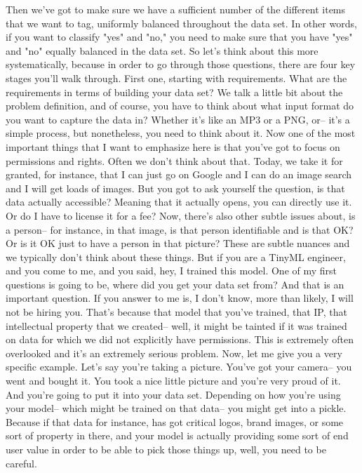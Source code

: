 Then we've got to make sure we have a sufficient number
of the different items that we want to tag, uniformly
balanced throughout the data set.
In other words, if you want to classify "yes" and "no,"
you need to make sure that you have "yes" and "no" equally balanced
in the data set.
So let's think about this more systematically,
because in order to go through those questions,
there are four key stages you'll walk through.
First one, starting with requirements.
What are the requirements in terms of building your data set?
We talk a little bit about the problem definition,
and of course, you have to think about what input format do you
want to capture the data in?
Whether it's like an MP3 or a PNG, or--
it's a simple process, but nonetheless, you need to think about it.
Now one of the most important things that I want to emphasize
here is that you've got to focus on permissions and rights.
Often we don't think about that.
Today, we take it for granted, for instance, that I can just go on Google
and I can do an image search and I will get loads of images.
But you got to ask yourself the question,
is that data actually accessible?
Meaning that it actually opens, you can directly use it.
Or do I have to license it for a fee?
Now, there's also other subtle issues about,
is a person-- for instance, in that image, is that person identifiable
and is that OK?
Or is it OK just to have a person in that picture?
These are subtle nuances and we typically
don't think about these things.
But if you are a TinyML engineer, and you come to me, and you said,
hey, I trained this model.
One of my first questions is going to be,
where did you get your data set from?
And that is an important question.
If you answer to me is, I don't know, more than likely,
I will not be hiring you.
That's because that model that you've trained, that IP,
that intellectual property that we created--
well, it might be tainted if it was trained on data for which we did not
explicitly have permissions.
This is extremely often overlooked and it's an extremely serious problem.
Now, let me give you a very specific example.
Let's say you're taking a picture.
You've got your camera-- you went and bought it.
You took a nice little picture and you're very proud of it.
And you're going to put it into your data set.
Depending on how you're using your model--
which might be trained on that data--
you might get into a pickle.
Because if that data for instance, has got critical logos, brand images,
or some sort of property in there, and your model is actually
providing some sort of end user value in order
to be able to pick those things up, well, you need to be careful.
